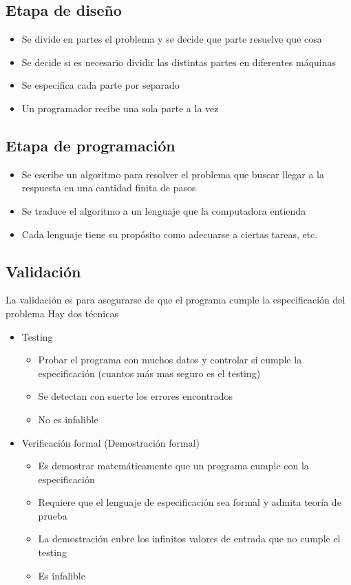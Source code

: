 \documentclass[a4paper,10pt]{article}
\begin{document}
\subsection{Etapa de diseño}
\begin{itemize}
	\item Se divide en partes el problema y se decide que parte resuelve que cosa
	\item Se decide si es necesario dividir las distintas partes en diferentes máquinas
	\item Se especifica cada parte por separado
	\item Un programador recibe una sola parte a la vez
\end{itemize}
\subsection{Etapa de programación}
\begin{itemize}
	\item Se escribe un algoritmo para resolver el problema que buscar llegar a la respuesta en una cantidad finita de pasos
	\item Se traduce el algoritmo a un lenguaje que la computadora entienda
	\item Cada lenguaje tiene su propósito como adecuarse a ciertas tareas, etc.
\end{itemize}
\subsection{Validación}
	La validación es para asegurarse de que el programa cumple la especificación del problema
	Hay dos técnicas
	\begin{itemize}
		\item Testing
		\begin{itemize}
			\item Probar el programa con muchos datos y controlar si cumple la especificación (cuantos más mas seguro es el testing)
			\item Se detectan con suerte los errores encontrados
			\item No es infalible
		\end{itemize}
		\item Verificación formal (Demostración formal)
		\begin{itemize}
			\item Es demostrar matemáticamente que un programa cumple con la especificación
			\item Requiere que el lenguaje de especificación sea formal y admita teoría de prueba
			\item La demostración cubre los infinitos valores de entrada que no cumple el testing
			\item Es infalible
		\end{itemize}
	\end{itemize}
\end{document}
